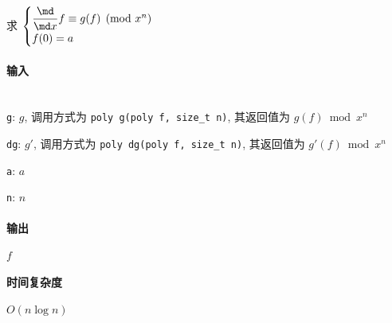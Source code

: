 求 \(\displaystyle\begin{cases}
    \dfrac{\md}{\md x}f\equiv g(f)\pmod{x^n} \\
    f(0)=a
\end{cases}\)

\paragraph{输入}~\\

\verb|g|: \(g\), 调用方式为 \verb|poly g(poly f, size_t n)|, 其返回值为 \(g(f)\bmod{x^n}\)

\verb|dg|: \(g'\), 调用方式为 \verb|poly dg(poly f, size_t n)|, 其返回值为 \(g'(f)\bmod{x^n}\)

\verb|a|: \(a\)

\verb|n|: \(n\)

\paragraph{输出}

\(f\)

\paragraph{时间复杂度}

\(O(n\log n)\)
